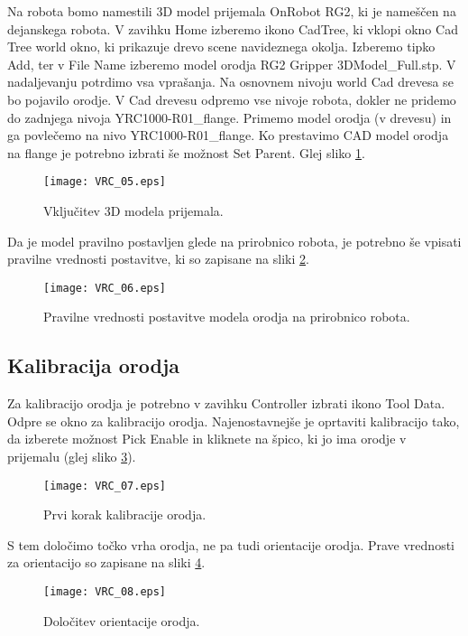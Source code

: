 Na robota bomo namestili 3D model prijemala OnRobot RG2, ki je nameščen na dejanskega robota. V zavihku Home izberemo ikono CadTree, ki vklopi okno Cad Tree world okno, ki prikazuje drevo scene navideznega okolja. Izberemo tipko Add, ter v File Name izberemo model orodja RG2 Gripper 3DModel\_Full.stp. V nadaljevanju potrdimo vsa vprašanja. Na osnovnem nivoju world Cad drevesa se bo pojavilo orodje. V Cad drevesu odpremo vse nivoje robota, dokler ne pridemo do zadnjega nivoja YRC1000-R01\_flange. Primemo model orodja (v drevesu) in ga povlečemo na nivo YRC1000-R01\_flange. Ko prestavimo CAD model orodja na flange je potrebno izbrati še možnost Set Parent. Glej sliko \ref{fig:VRC_05}.

\begin{figure}[hbt]
	\centering
	\texttt{[image: VRC\_05.eps]}
	\caption{Vključitev 3D modela prijemala.}
	\label{fig:VRC_05}
\end{figure}

Da je model pravilno postavljen glede na prirobnico robota, je potrebno še vpisati pravilne vrednosti postavitve, ki so zapisane na sliki \ref{fig:VRC_06}.

\begin{figure}[hbt]
	\centering
	\texttt{[image: VRC\_06.eps]}
	\caption{Pravilne vrednosti postavitve modela orodja na prirobnico robota.}
	\label{fig:VRC_06}
\end{figure}

\subsection*{Kalibracija orodja}

Za kalibracijo orodja je potrebno v zavihku Controller izbrati ikono Tool Data. Odpre se okno za kalibracijo orodja. Najenostavnejše je oprtaviti kalibracijo tako, da izberete možnost Pick Enable in kliknete na špico, ki jo ima orodje v prijemalu (glej sliko \ref{fig:VRC_07}).

\begin{figure}[hbt]
	\centering
	\texttt{[image: VRC\_07.eps]}
	\caption{Prvi korak kalibracije orodja.}
	\label{fig:VRC_07}
\end{figure}

 S tem določimo točko vrha orodja, ne pa tudi orientacije orodja. Prave vrednosti za orientacijo so zapisane na sliki \ref{fig:VRC_08}.
 
\begin{figure}[hbt]
	\centering
	\texttt{[image: VRC\_08.eps]}
	\caption{Določitev orientacije orodja.}
	\label{fig:VRC_08}
\end{figure}

